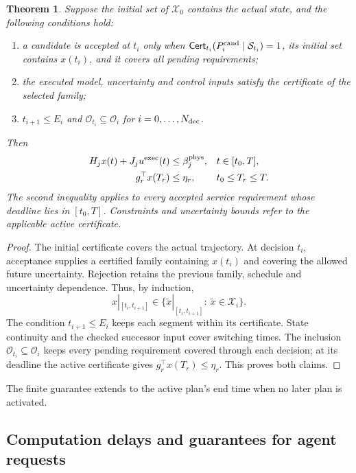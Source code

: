 \documentclass[final]{cas-sc}
\theoremstyle{definition}
\theoremstyle{plain}
\newtheorem{theorem}{Theorem}
\theoremstyle{definition}
\theoremstyle{plain}
\begin{document}
\begin{theorem}
\label{thm:new-plan-closure}
Suppose the initial set of $\mathcal X_0$ contains the actual state,
and the following conditions hold:
\begin{enumerate}
\renewcommand{\labelenumi}{(\alph{enumi})}
\item a candidate is accepted at $t_i$ only when
$\mathsf{Cert}_{t_i}(P_i^{\rm cand}\mid\mathcal S_{t_i})=1$, its
initial set contains $x(t_i)$, and it covers all pending requirements;
\item the executed model, uncertainty and control inputs satisfy the
certificate of the selected family;
\item $t_{i+1}\le E_i$ and $\mathcal O_{t_i}\subseteq\mathcal O_i$ for
$i=0,\ldots,N_{\rm dec}$.
\end{enumerate}
Then
\begin{equation}
\begin{aligned}
H_jx(t)+J_ju^{\rm exec}(t)&\le\beta_j^{\rm phys},&& t\in[t_0,T],\\
g_r^\top x(T_r)&\le\eta_r,&& t_0\le T_r\le T.
\end{aligned}
\label{eq:execution-physical-service}
\end{equation}
The second inequality applies to every accepted service requirement
whose deadline lies in $[t_0,T]$. Constraints and uncertainty bounds
refer to the applicable active certificate.
\end{theorem}

\begin{proof}
The initial certificate covers the actual trajectory. At decision
$t_i$, acceptance supplies a certified family containing $x(t_i)$ and
covering the allowed future uncertainty. Rejection retains the previous
family, schedule and uncertainty dependence. Thus, by induction,
\[
x|_{[t_i,t_{i+1}]}\in\{\widetilde x|_{[t_i,t_{i+1}]}:\
\widetilde x\in\mathcal X_i\}.
\]
The condition $t_{i+1}\le E_i$ keeps each segment within its
certificate. State continuity and the checked successor input cover
switching times. The inclusion
$\mathcal O_{t_i}\subseteq\mathcal O_i$ keeps every pending requirement
covered through each decision; at its deadline the active certificate
gives $g_r^\top x(T_r)\le\eta_r$. This proves both claims.
\end{proof}

The finite guarantee extends to the active plan's end time when no
later plan is activated.

\subsection{Computation delays and guarantees for agent requests}
\label{sec:planned-handover}
\end{document}
